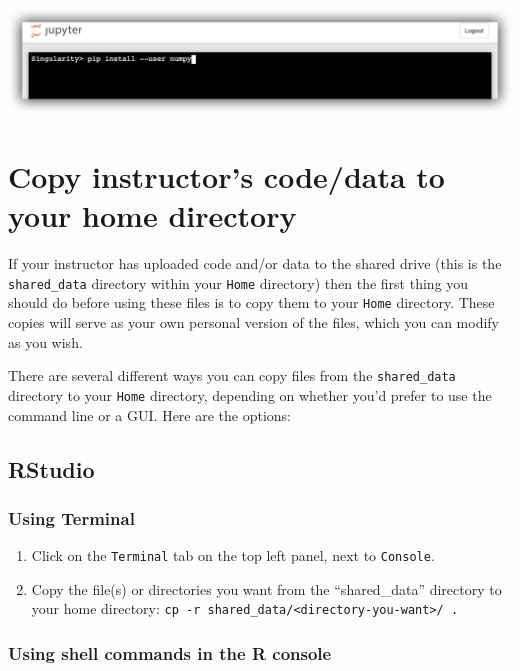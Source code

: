 \documentclass[]{book}
\providecommand{\tightlist}{%
  \setlength{\itemsep}{0pt}\setlength{\parskip}{0pt}}
\begin{document}
\includegraphics{images/10_jupyter_terminal_install.png}

\hypertarget{copy-instructors-codedata-to-your-home-directory}{%
\chapter{Copy instructor's code/data to your home directory}\label{copy-instructors-codedata-to-your-home-directory}}

If your instructor has uploaded code and/or data to the shared drive (this is the \texttt{shared\_data} directory within your \texttt{Home} directory) then the first thing you should do before using these files is to copy them to your \texttt{Home} directory. These copies will serve as your own personal version of the files, which you can modify as you wish.

There are several different ways you can copy files from the \texttt{shared\_data} directory to your \texttt{Home} directory, depending on whether you'd prefer to use the command line or a GUI. Here are the options:

\hypertarget{rstudio-2}{%
\section{RStudio}\label{rstudio-2}}

\hypertarget{using-terminal}{%
\subsection{Using Terminal}\label{using-terminal}}

\begin{enumerate}
\def\labelenumi{\arabic{enumi}.}
\tightlist
\item
  Click on the \texttt{Terminal} tab on the top left panel, next to \texttt{Console}.
\item
  Copy the file(s) or directories you want from the ``shared\_data'' directory to your home directory: \texttt{cp\ -r\ shared\_data/\textless{}directory-you-want\textgreater{}/\ .}
\end{enumerate}

\hypertarget{using-shell-commands-in-the-r-console}{%
\subsection{Using shell commands in the R console}\label{using-shell-commands-in-the-r-console}}
\end{document}
